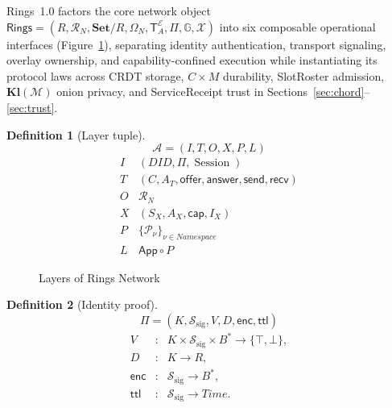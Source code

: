 \documentclass[journal]{IEEEtran}
\newtheorem{definition}{Definition}
\DeclareRobustCommand{\code}[1]{{\ttfamily\renewcommand{\_}{\textunderscore\allowbreak}#1}}
\begin{document}
Rings~1.0 factors the core network object $\mathsf{Rings}=(R,\mathcal{R}_N,\mathbf{Set}/R,\Omega_N,\mathsf{T}^{\mathcal{E}}_A,\Pi,\mathbb{G},\mathcal{X})$ into six composable operational interfaces (Figure~\ref{layers}), separating identity authentication, transport signaling, overlay ownership, and capability-confined execution while instantiating its protocol laws across CRDT storage, $C\times M$ durability, \code{SlotRoster} admission, $\mathbf{Kl}(\mathcal{M})$ onion privacy, and \code{ServiceReceipt} trust in Sections~\ref{sec:chord}--\ref{sec:trust}.

\begin{definition}[Layer tuple]
\[
  \mathcal{A}=(I,T,O,X,P,L)
\]
\[
\begin{array}{c|c}
I & (DID,\Pi,\operatorname{Session})\\
T & (C,A_T,\mathsf{offer},\mathsf{answer},\mathsf{send},\mathsf{recv})\\
O & \mathcal{R}_N\\
X & (S_X,A_X,\mathsf{cap},I_X)\\
P & \{\mathcal{P}_\nu\}_{\nu\in Namespace}\\
L & \mathsf{App}\circ P
\end{array}
\]
\end{definition}

\begin{figure}[htbp]
\centering
{}
\caption{Layers of Rings Network}
\label{layers}
\end{figure}

\begin{definition}[Identity proof]
\[
  \Pi=(K,\mathcal{S}_{\mathrm{sig}},V,D,\mathsf{enc},\mathsf{ttl})
\]
\[
\begin{array}{rcl}
V&:&K\times\mathcal{S}_{\mathrm{sig}}\times B^*\to\{\top,\bot\},\\
D&:&K\to R,\\
\mathsf{enc}&:&\mathcal{S}_{\mathrm{sig}}\to B^*,\\
\mathsf{ttl}&:&\mathcal{S}_{\mathrm{sig}}\to Time.
\end{array}
\]
\end{definition}
\end{document}
